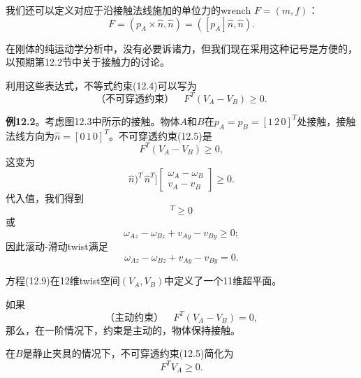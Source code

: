 \documentclass[12pt,a4paper]{article}
\begin{document}
我们还可以定义对应于沿接触法线施加的单位力的wrench $F = (m, f)$：
\begin{equation}
F = (p_A \times \hat{n}, \hat{n}) = ([p_A]\hat{n}, \hat{n}).
\end{equation}

在刚体的纯运动学分析中，没有必要诉诸力，但我们现在采用这种记号是方便的，以预期第12.2节中关于接触力的讨论。

利用这些表达式，不等式约束(12.4)可以写为
\begin{equation}
\text{（不可穿透约束）} \quad F^T (V_A - V_B) \geq 0.
\label{eq:12.5}
\end{equation}

\textbf{例12.2}。考虑图12.3中所示的接触。物体$A$和$B$在$p_A = p_B = [1 \, 2 \, 0]^T$处接触，接触法线方向为$\hat{n} = [0 \, 1 \, 0]^T$。不可穿透约束(12.5)是
\begin{equation}
F^T (V_A - V_B) \geq 0,
\end{equation}
这变为
\begin{equation}
[([p_A]\hat{n})^T \, \hat{n}^T] \begin{bmatrix} \omega_A - \omega_B \\ v_A - v_B \end{bmatrix} \geq 0.
\end{equation}
代入值，我们得到
\begin{equation}
[0 \, 0 \, 1 \, 0 \, 1 \, 0][\omega_{Ax} - \omega_{Bx} \, \omega_{Ay} - \omega_{By} \, \omega_{Az} - \omega_{Bz} \, v_{Ax} - v_{Bx} \, v_{Ay} - v_{By} \, v_{Az} - v_{Bz}]^T \geq 0
\end{equation}
或
\begin{equation}
\omega_{Az} - \omega_{Bz} + v_{Ay} - v_{By} \geq 0;
\end{equation}
因此滚动-滑动twist满足
\begin{equation}
\omega_{Az} - \omega_{Bz} + v_{Ay} - v_{By} = 0.
\label{eq:12.9}
\end{equation}

方程(12.9)在12维twist空间$(V_A, V_B)$中定义了一个11维超平面。

如果
\begin{equation}
\text{（主动约束）} \quad F^T (V_A - V_B) = 0,
\label{eq:12.6}
\end{equation}
那么，在一阶情况下，约束是主动的，物体保持接触。

在$B$是静止夹具的情况下，不可穿透约束(12.5)简化为
\begin{equation}
F^T V_A \geq 0.
\label{eq:12.7}
\end{equation}
\end{document}

